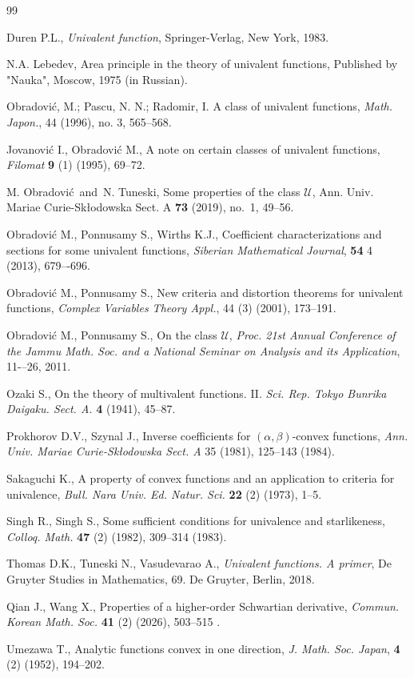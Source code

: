 \documentclass{amsart}
\begin{document}
\begin{thebibliography}{99}

Duren P.L., \textit{Univalent function}, Springer-Verlag, New York, 1983.



N.A. Lebedev, Area principle in the theory of univalent functions, Published by "Nauka", Moscow, 1975 (in Russian).


Obradovi\'{c}, M.; Pascu, N. N.; Radomir, I. A class of univalent functions, \textit{Math. Japon.}, 44 (1996), no. 3, 565--568.

Jovanovi\'{c} I., Obradovi\'{c} M.,  A note on certain classes of univalent functions, \emph{Filomat} \textbf{9} (1) (1995), 69--72.

M. Obradovi\'{c}\ and\ N. Tuneski, Some properties of the class $\mathcal{U}$, Ann. Univ. Mariae Curie-Sk\l odowska Sect. A {\bf 73} (2019), no.~1, 49--56.

Obradovi\'{c} M., Ponnusamy S., Wirths K.J., Coefficient characterizations and sections for some univalent functions,
\emph{Siberian Mathematical Journal}, \textbf{54} 4 (2013), 679–-696.

Obradovi\'{c} M., Ponnusamy S., New criteria and distortion theorems for univalent functions, \textit{Complex Variables Theory Appl.}, 44 (3) (2001), 173--191.

Obradovi\'{c} M., Ponnusamy S., On the class $\mathcal{U}$, \textit{Proc. 21st Annual Conference
of the Jammu Math. Soc. and a National Seminar on Analysis and its Application}, 11-–26, 2011.

Ozaki S., On the theory of multivalent functions. II. \emph{Sci. Rep. Tokyo Bunrika Daigaku. Sect. A.} \textbf{4} (1941), 45--87.

Prokhorov D.V., Szynal J., Inverse coefficients for $(\alpha ,\beta )$-convex functions, \emph{Ann. Univ. Mariae Curie-Sk{\l}odowska Sect. A} 35 (1981), 125--143 (1984).

Sakaguchi K., A property of convex functions and an application to criteria for univalence, \emph{Bull. Nara Univ. Ed. Natur. Sci.} \textbf{22} (2) (1973), 1--5.

Singh R., Singh S.,  Some sufficient conditions for univalence and starlikeness, \emph{Colloq. Math.} \textbf{47} (2) (1982), 309--314 (1983).

Thomas D.K., Tuneski N., Vasudevarao A., \textit{Univalent functions. A primer}, De Gruyter Studies in Mathematics, 69. De Gruyter, Berlin, 2018.

Qian J., Wang X., Properties of a higher-order Schwartian derivative, \emph{Commun. Korean Math. Soc. } \textbf{41} (2) (2026), 503--515 .

Umezawa T.,  Analytic functions convex in one direction, \emph{J. Math. Soc. Japan}, \textbf{4} (2) (1952), 194--202.

\end{thebibliography}

\medskip
\end{document}
